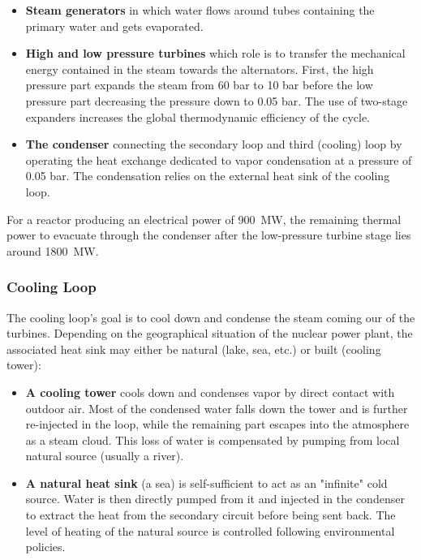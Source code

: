 \begin{itemize}
\item \textbf{Steam generators} in which water flows around tubes containing the primary water and gets evaporated.

\item \textbf{High and low pressure turbines} which role is to transfer the mechanical energy contained in the steam towards the alternators. First, the high pressure part expands the steam from 60 bar to 10 bar before the low pressure part decreasing the pressure down to 0.05 bar. The use of two-stage expanders increases the global thermodynamic efficiency of the cycle.

\item \textbf{The condenser} connecting the secondary loop and third (cooling) loop by operating the heat exchange dedicated to vapor condensation at a pressure of 0.05 bar. The condensation relies on the external heat sink of the cooling loop.
\end{itemize}


For a reactor producing an electrical power of 900~MW, the remaining thermal power to evacuate through the condenser after the low-pressure turbine stage lies around 1800~MW.


\subsubsection{Cooling Loop}


The cooling loop's goal is to cool down and condense the steam coming our of the turbines. Depending on the geographical situation of the nuclear power plant, the associated heat sink may either be natural (lake, sea, etc.) or built (cooling tower):


\begin{itemize}
\item \textbf{A cooling tower} cools down and condenses vapor by direct contact with outdoor air. Most of the condensed water falls down the tower and is further re-injected in the loop, while the remaining part escapes into the atmosphere as a steam cloud. This loss of water is compensated by pumping from local natural source (usually a river).

\item \textbf{A natural heat sink} (\eg a sea) is self-sufficient to act as an "infinite" cold source. Water is then directly pumped from it and injected in the condenser to extract the heat from the secondary circuit before being sent back. The level of heating of the natural source is controlled following environmental policies. 

\end{itemize}


